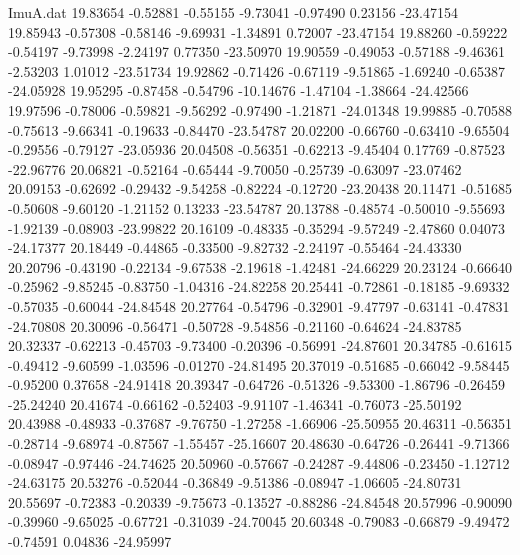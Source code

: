 \begin{filecontents}{ImuA.dat}
  19.83654   -0.52881   -0.55155   -9.73041   -0.97490    0.23156  -23.47154
  19.85943   -0.57308   -0.58146   -9.69931   -1.34891    0.72007  -23.47154
  19.88260   -0.59222   -0.54197   -9.73998   -2.24197    0.77350  -23.50970
  19.90559   -0.49053   -0.57188   -9.46361   -2.53203    1.01012  -23.51734
  19.92862   -0.71426   -0.67119   -9.51865   -1.69240   -0.65387  -24.05928
  19.95295   -0.87458   -0.54796  -10.14676   -1.47104   -1.38664  -24.42566
  19.97596   -0.78006   -0.59821   -9.56292   -0.97490   -1.21871  -24.01348
  19.99885   -0.70588   -0.75613   -9.66341   -0.19633   -0.84470  -23.54787
  20.02200   -0.66760   -0.63410   -9.65504   -0.29556   -0.79127  -23.05936
  20.04508   -0.56351   -0.62213   -9.45404    0.17769   -0.87523  -22.96776
  20.06821   -0.52164   -0.65444   -9.70050   -0.25739   -0.63097  -23.07462
  20.09153   -0.62692   -0.29432   -9.54258   -0.82224   -0.12720  -23.20438
  20.11471   -0.51685   -0.50608   -9.60120   -1.21152    0.13233  -23.54787
  20.13788   -0.48574   -0.50010   -9.55693   -1.92139   -0.08903  -23.99822
  20.16109   -0.48335   -0.35294   -9.57249   -2.47860    0.04073  -24.17377
  20.18449   -0.44865   -0.33500   -9.82732   -2.24197   -0.55464  -24.43330
  20.20796   -0.43190   -0.22134   -9.67538   -2.19618   -1.42481  -24.66229
  20.23124   -0.66640   -0.25962   -9.85245   -0.83750   -1.04316  -24.82258
  20.25441   -0.72861   -0.18185   -9.69332   -0.57035   -0.60044  -24.84548
  20.27764   -0.54796   -0.32901   -9.47797   -0.63141   -0.47831  -24.70808
  20.30096   -0.56471   -0.50728   -9.54856   -0.21160   -0.64624  -24.83785
  20.32337   -0.62213   -0.45703   -9.73400   -0.20396   -0.56991  -24.87601
  20.34785   -0.61615   -0.49412   -9.60599   -1.03596   -0.01270  -24.81495
  20.37019   -0.51685   -0.66042   -9.58445   -0.95200    0.37658  -24.91418
  20.39347   -0.64726   -0.51326   -9.53300   -1.86796   -0.26459  -25.24240
  20.41674   -0.66162   -0.52403   -9.91107   -1.46341   -0.76073  -25.50192
  20.43988   -0.48933   -0.37687   -9.76750   -1.27258   -1.66906  -25.50955
  20.46311   -0.56351   -0.28714   -9.68974   -0.87567   -1.55457  -25.16607
  20.48630   -0.64726   -0.26441   -9.71366   -0.08947   -0.97446  -24.74625
  20.50960   -0.57667   -0.24287   -9.44806   -0.23450   -1.12712  -24.63175
  20.53276   -0.52044   -0.36849   -9.51386   -0.08947   -1.06605  -24.80731
  20.55697   -0.72383   -0.20339   -9.75673   -0.13527   -0.88286  -24.84548
  20.57996   -0.90090   -0.39960   -9.65025   -0.67721   -0.31039  -24.70045
  20.60348   -0.79083   -0.66879   -9.49472   -0.74591    0.04836  -24.95997

\end{filecontents}
